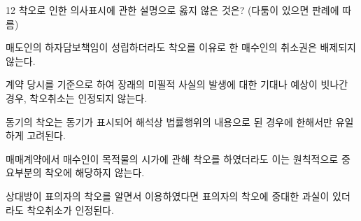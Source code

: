 \begin{question}{12}
착오로 인한 의사표시에 관한 설명으로 옳지 않은 것은? (다툼이 있으면 판례에 따름)
\begin{choices}
  \item 매도인의 하자담보책임이 성립하더라도 착오를 이유로 한 매수인의 취소권은 배제되지 않는다.
  \item 계약 당시를 기준으로 하여 장래의 미필적 사실의 발생에 대한 기대나 예상이 빗나간 경우, 착오취소는 인정되지 않는다.
  \item 동기의 착오는 동기가 표시되어 해석상 법률행위의 내용으로 된 경우에 한해서만 유일하게 고려된다.
  \item 매매계약에서 매수인이 목적물의 시가에 관해 착오를 하였더라도 이는 원칙적으로 중요부분의 착오에 해당하지 않는다.
  \item 상대방이 표의자의 착오를 알면서 이용하였다면 표의자의 착오에 중대한 과실이 있더라도 착오취소가 인정된다.
\end{choices}
\end{question}
